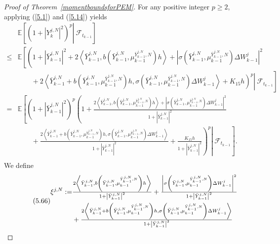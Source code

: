 \documentclass[12pt]{article}
\numberwithin{equation}{section}
\begin{document}
\begin{proof}[Proof of Theorem~\ref{momentboundsforPEM}]
For any positive integer  $p \geq 2$,  applying (\ref{5.1}) and (\ref{5.14}) yields
\begin{equation}\tag{5.65}\label{5.18}
\begin{aligned}
&\mathbb{E} \left[\left. \left( 1+\left| Y_{k}^{j,N} \right|^2 \right) ^p\right\rvert\ \mathcal{F} _{t_{k-1}} \right] \\
\leq& \mathbb{E} \left[ \left( 1+\left| \bar{Y}_{k-1}^{j,N} \right|^2+2\left \langle \bar{Y}_{k-1}^{j,N},b\left( \bar{Y}_{k-1}^{j,N},\mu _{k-1}^{\bar{Y}_{k-1}^{j,N},N} \right) h \right \rangle +\left| \sigma \left( \bar{Y}_{k-1}^{j,N},\mu _{k-1}^{\bar{Y}_{k-1}^{j,N},N} \right) \Delta W_{k-1}^{j} \right|^2\right.\right.\\
&\qquad +\left.\left.\left.2\left \langle \bar{Y}_{k-1}^{j,N}+b\left( \bar{Y}_{k-1}^{j,N},\mu _{k-1}^{\bar{Y}_{k-1}^{j,N},N} \right) h,\sigma \left( \bar{Y}_{k-1}^{j,N},\mu _{k-1}^{\bar{Y}_{k-1}^{j,N},N} \right) \Delta W_{k-1}^{j} \right \rangle +K_{15}h \right) ^p\right\rvert\ \mathcal{F} _{t_{k-1}} \right] \\
=& \mathbb{E} \left[ \left( 1+\left| \bar{Y}_{k-1}^{j,N} \right|^2 \right) ^p\left( 1+\tfrac{2\left\langle \bar{Y}_{k-1}^{j,N},b\left( \bar{Y}_{k-1}^{j,N},\mu _{k-1}^{\bar{Y}_{k-1}^{j,N},N} \right) h \right \rangle +\left| \sigma \left( \bar{Y}_{k-1}^{j,N},\mu _{k-1}^{\bar{Y}_{k-1}^{j,N},N} \right) \Delta W_{k-1}^{j} \right|^2}{1+\left| \bar{Y}_{k-1}^{j,N} \right|^2}\right.\right.\\
&\qquad +\left.\left.\left.\tfrac{ 2\left\langle \bar{Y}_{k-1}^{j,N}+b\left( \bar{Y}_{k-1}^{j,N},\mu _{k-1}^{\bar{Y}_{k-1}^{j,N},N} \right) h,\sigma \left( \bar{Y}_{k-1}^{j,N},\mu _{k-1}^{\bar{Y}_{k-1}^{j,N},N} \right) \Delta W_{k-1}^{j} \right\rangle}{1+\left| \bar{Y}_{k-1}^{j,N} \right|^2}+\tfrac{K_{15}h}{1+\left| \bar{Y}_{k-1}^{j,N} \right|^2}\right) ^p\right\rvert\ \mathcal{F} _{t_{k-1}} \right]. \\
\end{aligned}
\end{equation}
We define
\begin{equation}\tag{5.66}\label{5.19}
\begin{aligned}
\xi^{j,N}:=&\tfrac{2\left\langle \Bar{Y}^{j,N}_{k-1},b\left(\bar{Y}^{j,N}_{k-1},\mu^{\bar{Y}^{j,N}_{k-1},N}_{k-1}\right) h\right\rangle}{1+\left|\Bar{Y}^{j,N}_{k-1}\right|^2}+\tfrac{\left|\sigma\left(\bar{Y}^{j,N}_{k-1},\mu^{\bar{Y}^{j,N}_{k-1},N}_{k-1}\right) \Delta W_{k-1}^{j}\right|^2}{1+\left|\Bar{Y}^{j,N}_{k-1}\right|^2}\\
&+\tfrac{2\left\langle \Bar{Y}^{j,N}_{k-1}+b\left(\bar{Y}^{j,N}_{k-1},\mu^{\bar{Y}^{j,N}_{k-1},N}_{k-1}\right) h , \sigma\left(\bar{Y}^{j,N}_{k-1},\mu^{\bar{Y}^{j,N}_{k-1},N}_{k-1}\right)\Delta W_{k-1}^{j}\right\rangle}{1+\left|\Bar{Y}^{j,N}_{k-1}\right|^2}\\

\end{aligned}
\end{equation}
\end{proof}
\end{document}
